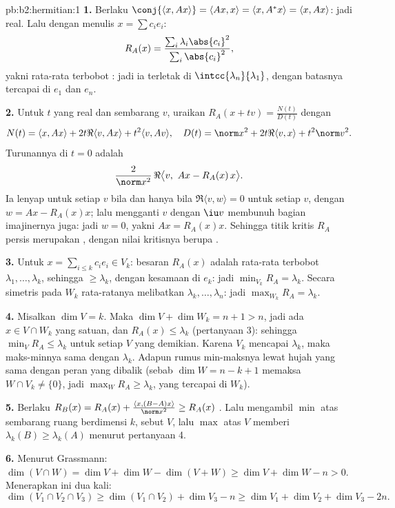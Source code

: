 \begin{solution}{pb:b2:hermitian:1}
\textbf{1.} Berlaku $\conj{\langle x, Ax\rangle} = \langle Ax, x\rangle
= \langle x, A^*x\rangle = \langle x, Ax\rangle$: jadi real. Lalu dengan menulis
$x = \sum c_ie_i$:
\[
R_A(x) = \frac{\sum_i\lambda_i\abs{c_i}^2}
{\sum_i\abs{c_i}^2} ,
\]
yakni rata-rata terbobot : jadi ia terletak di
$\intcc{\lambda_n}{\lambda_1}$, dengan batasnya tercapai di
$e_1$ dan $e_n$.

\textbf{2.} Untuk $t$ yang real dan sembarang $v$, uraikan $R_A(x + tv) =
\frac{N(t)}{D(t)}$ dengan
\[
N(t) = \langle x, Ax\rangle + 2t\Re\langle v, Ax\rangle +
t^2\langle v, Av\rangle,
\quad
D(t) = \norm x^2 + 2t\Re\langle v, x\rangle + t^2\norm v^2 .
\]
Turunannya di $t = 0$ adalah
\[
\frac{2}{\norm x^2}\,
\Re\bigl\langle v,\ Ax - R_A(x)\,x\bigr\rangle .
\]
Ia lenyap untuk setiap $v$ bila dan hanya bila $\Re\langle v, w\rangle = 0$ untuk
setiap $v$, dengan $w = Ax - R_A(x)x$; lalu mengganti $v$ dengan $\iu v$
membunuh bagian imajinernya juga: jadi $w = 0$, yakni $Ax = R_A(x)x$.
Sehingga titik kritis $R_A$ persis merupakan , dengan
nilai kritisnya berupa .

\textbf{3.} Untuk $x = \sum_{i\leq k}c_ie_i \in V_k$: besaran $R_A(x)$
adalah rata-rata terbobot $\lambda_1, \dots, \lambda_k$, sehingga
$\geq \lambda_k$, dengan kesamaan di $e_k$: jadi $\min_{V_k} R_A =
\lambda_k$. Secara simetris pada $W_k$ rata-ratanya melibatkan
$\lambda_k, \dots, \lambda_n$: jadi $\max_{W_k}R_A = \lambda_k$.

\textbf{4.} Misalkan $\dim V = k$. Maka $\dim V + \dim W_k = n + 1 >
n$, jadi ada $x \in V \cap W_k$ yang satuan, dan $R_A(x) \leq
\lambda_k$ (pertanyaan 3): sehingga $\min_{V}R_A \leq \lambda_k$ untuk setiap
$V$ yang demikian. Karena $V_k$ mencapai $\lambda_k$, maka maks-minnya sama dengan
$\lambda_k$. Adapun rumus min-maksnya lewat hujah yang sama dengan
peran yang dibalik (sebab $\dim W = n - k + 1$ memaksa $W \cap V_k \neq
\{0\}$, jadi $\max_W R_A \geq \lambda_k$, yang tercapai di $W_k$).

\textbf{5.} Berlaku $R_B(x) = R_A(x) + \frac{\langle x,
(B-A)x\rangle}{\norm x^2} \geq R_A(x)$ . Lalu mengambil
$\min$ atas sembarang ruang berdimensi $k$, sebut $V$, lalu $\max$ atas $V$ memberi
$\lambda_k(B) \geq \lambda_k(A)$ menurut pertanyaan 4.

\textbf{6.} Menurut Grassmann: $\dim(V\cap W) = \dim V + \dim W -
\dim(V + W) \geq \dim V + \dim W - n > 0$. Menerapkan ini dua kali:
\[
\dim(V_1\cap V_2\cap V_3)
\geq \dim(V_1\cap V_2) + \dim V_3 - n
\geq \dim V_1 + \dim V_2 + \dim V_3 - 2n .
\]


\end{solution}

